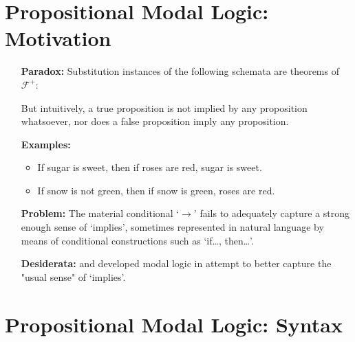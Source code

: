 \documentclass[a4paper, 11pt]{article} %
\begin{document}
\pagebreak




\section*{\sc Propositional Modal Logic: Motivation}

\begin{enumerate}[leftmargin=1.2in,labelsep=.15in] 
\item[\bf Paradox:] Substitution instances of the following schemata are theorems of $\mathcal{F}^+$:
	\begin{itemize}\small
	\begin{multicols}{2}
	\item[(1)] $A\rightarrow(B\rightarrow A)$.
	\item[(2)] $\neg A\rightarrow(A\rightarrow B)$.
	\end{multicols}
	\end{itemize}
	But intuitively, a true proposition is not implied by any proposition whatsoever, nor does a false proposition imply any proposition.
\item[\bf Examples:] 
	\begin{itemize}
	\item If sugar is sweet, then if roses are red, sugar is sweet.
	\item If snow is not green, then if snow is green, roses are red.
	\end{itemize}
\item[\bf Problem:] The material conditional `$\rightarrow$' fails to adequately capture a strong enough sense of `implies', sometimes represented in natural language by means of conditional constructions such as `if\dots, then\dots'.%
\item[\bf Desiderata:] \citet{Lewis1912} and \citet{Lewis1932} developed modal logic in attempt to better capture the "usual sense" of `implies'.
\end{enumerate}





\section*{\sc Propositional Modal Logic: Syntax}
\end{document}

